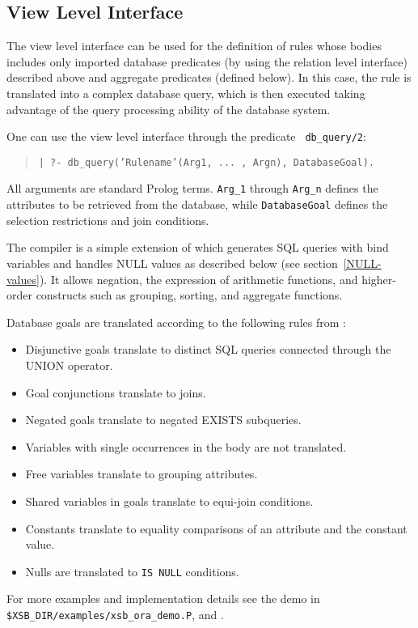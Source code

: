 \subsection{View Level Interface}



   The view level interface can be used for the definition of rules
whose bodies includes only imported database predicates (by using the
relation level interface) described above and aggregate predicates
(defined below).  In this case, the rule is translated into a complex
database query, which is then executed taking advantage of the query
processing ability of the database system.

One can use the view level interface through the predicate {\tt
db\_query/2}:  
\begin{quote}
{\tt | ?- db\_query('Rulename'(Arg1, ... , Argn), DatabaseGoal).}
\end{quote}
All arguments are standard Prolog terms.  {\tt Arg\_1} through {\tt Arg\_n}
defines the attributes to be retrieved from the database, while
{\tt DatabaseGoal} defines the selection restrictions and join conditions.

The compiler is a simple extension of \cite{Drax92} which generates SQL
queries with bind variables and handles NULL values as described below
(see section~\ref{NULL-values}).  It allows negation, the expression of
arithmetic functions, and higher-order constructs such as grouping,
sorting, and aggregate functions.

Database goals are translated according to the following rules
from \cite{Drax92}:
\begin{itemize}
\item Disjunctive goals translate to distinct SQL queries
	connected through the UNION operator.
\item Goal conjunctions translate to joins.
\item Negated goals translate to negated EXISTS subqueries.
\item Variables with single occurrences in the body are not
	  translated.
\item Free variables translate to grouping attributes.
\item Shared variables in goals translate to equi-join conditions.
\item Constants translate to equality comparisons of an attribute and
	  the constant value.
\item Nulls are translated to {\tt IS NULL} conditions.
\end{itemize}
For more examples and implementation details see the demo in 
{\tt \$XSB\_DIR/examples/xsb\_ora\_demo.P}, and \cite{Drax92}.
 
